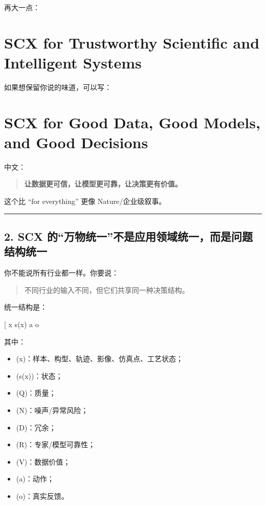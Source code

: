 \documentclass[
  12pt,
]{ctexart}
\providecommand{\tightlist}{%
  \setlength{\itemsep}{0pt}\setlength{\parskip}{0pt}}
\begin{document}
再大一点：

\section{\texorpdfstring{\textbf{SCX for Trustworthy Scientific and
Intelligent
Systems}}{SCX for Trustworthy Scientific and Intelligent Systems}}\label{scx-for-trustworthy-scientific-and-intelligent-systems}

如果想保留你说的味道，可以写：

\section{\texorpdfstring{\textbf{SCX for Good Data, Good Models, and
Good
Decisions}}{SCX for Good Data, Good Models, and Good Decisions}}\label{scx-for-good-data-good-models-and-good-decisions}

中文：

\begin{quote}
\textbf{让数据更可信，让模型更可靠，让决策更有价值。}
\end{quote}

这个比 ``for everything'' 更像 Nature/企业级叙事。

\begin{center}\rule{0.5\linewidth}{0.5pt}\end{center}

\subsection{2. SCX
的``万物统一''不是应用领域统一，而是问题结构统一}\label{scx-ux7684ux4e07ux7269ux7edfux4e00ux4e0dux662fux5e94ux7528ux9886ux57dfux7edfux4e00ux800cux662fux95eeux9898ux7ed3ux6784ux7edfux4e00}

你不能说所有行业都一样。你要说：

\begin{quote}
不同行业的输入不同，但它们共享同一种决策结构。
\end{quote}

统一结构是：

{[} x \rightarrow s(x)  \rightarrow a
\rightarrow o \rightarrow \text{update}{]}

其中：

\begin{itemize}
\tightlist
\item
  (x)：样本、构型、轨迹、影像、仿真点、工艺状态；
\item
  (s(x))：状态；
\item
  (Q)：质量；
\item
  (N)：噪声/异常风险；
\item
  (D)：冗余；
\item
  (R)：专家/模型可靠性；
\item
  (V)：数据价值；
\item
  (a)：动作；
\item
  (o)：真实反馈。
\end{itemize}
\end{document}
